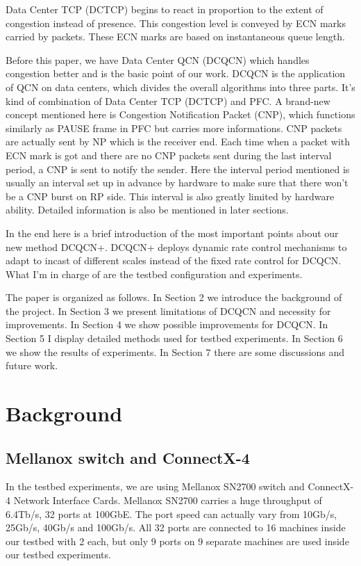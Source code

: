 \documentclass[12pt,a4paper]{article}
\begin{document}
Data Center TCP (DCTCP) \cite{dctcp} begins to react in proportion to the extent of congestion instead of presence.
This congestion level is conveyed by ECN marks carried by packets.
These ECN marks are based on instantaneous queue length.

Before this paper, we have Data Center QCN (DCQCN) \cite{dcqcn} which handles congestion better and is the basic point of our work.
DCQCN is the application of QCN on data centers, which divides the overall algorithms into three parts.
It's kind of combination of Data Center TCP (DCTCP) and PFC.
A brand-new concept mentioned here is Congestion Notification Packet (CNP), which functions similarly as PAUSE frame in PFC but carries more informations.
CNP packets are actually sent by NP which is the receiver end.
Each time when a packet with ECN mark is got and there are no CNP packets sent during the last interval period, a CNP is sent to notify the
sender.
Here the interval period mentioned is usually an interval set up in advance by hardware to make sure that there won't be a CNP burst on
RP side.
This interval is also greatly limited by hardware ability.
Detailed information is also be mentioned in later sections.

In the end here is a brief introduction of the most important points about our new method DCQCN+.
DCQCN+ deploys dynamic rate control mechanisms to adapt to incast of different scales instead of the fixed rate control for DCQCN.
What I'm in charge of are the testbed configuration and experiments.

The paper is organized as follows.
In Section 2 we introduce the background of the project.
In Section 3 we present limitations of DCQCN and necessity for improvements.
In Section 4 we show possible improvements for DCQCN.
In Section 5 I display detailed methods used for testbed experiments.
In Section 6 we show the results of experiments.
In Section 7 there are some discussions and future work.

\newpage
\section{Background}
\subsection{Mellanox switch and ConnectX-4}
In the testbed experiments, we are using Mellanox SN2700 switch and ConnectX-4 Network Interface Cards.
Mellanox SN2700 carries a huge throughput of 6.4Tb/s, 32 ports at 100GbE.
The port speed can actually vary from 10Gb/s, 25Gb/s, 40Gb/s and 100Gb/s.
All 32 ports are connected to 16 machines inside our testbed with 2 each, but only 9 ports on 9 separate machines are used inside our
testbed experiments.
\end{document}

